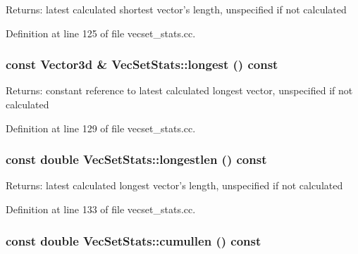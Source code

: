\begin{Desc}
\item[Returns:]latest calculated shortest vector's length, unspecified if not calculated \end{Desc}


Definition at line 125 of file vecset\_\-stats.cc.\hypertarget{class_vec_set_stats_c5e5192e85e5633cdedf4900f46adb1d}{
\subsubsection[longest]{\setlength{\rightskip}{0pt plus 5cm}const Vector3d \& VecSetStats::longest () const}}
\label{class_vec_set_stats_c5e5192e85e5633cdedf4900f46adb1d}


\begin{Desc}
\item[Returns:]constant reference to latest calculated longest vector, unspecified if not calculated \end{Desc}


Definition at line 129 of file vecset\_\-stats.cc.\hypertarget{class_vec_set_stats_746c64887edd603e6bf6d139078f8a5c}{
\subsubsection[longestlen]{\setlength{\rightskip}{0pt plus 5cm}const double VecSetStats::longestlen () const}}
\label{class_vec_set_stats_746c64887edd603e6bf6d139078f8a5c}


\begin{Desc}
\item[Returns:]latest calculated longest vector's length, unspecified if not calculated \end{Desc}


Definition at line 133 of file vecset\_\-stats.cc.\hypertarget{class_vec_set_stats_bada15ff01d5ab8b4a5addae68cd8b02}{
\subsubsection[cumullen]{\setlength{\rightskip}{0pt plus 5cm}const double VecSetStats::cumullen () const}}
\label{class_vec_set_stats_bada15ff01d5ab8b4a5addae68cd8b02}



